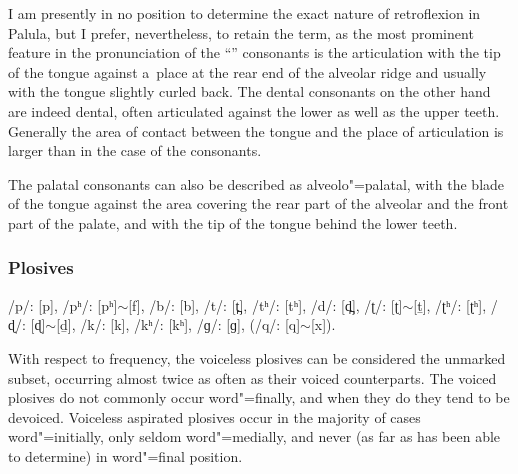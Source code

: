 


I am presently in no position to determine the exact nature of retroflexion in Palula, but I prefer, nevertheless, to retain the term, as the most prominent feature in the pronunciation of the ``'' consonants is the articulation with the tip of the tongue against a~place at the rear end of the alveolar ridge and usually with the tongue slightly curled back. The dental consonants on the other hand are indeed dental, often articulated against the lower as well as the upper teeth. Generally the area of contact between the tongue and the place of articulation is larger than in the case of the  consonants.


The palatal consonants can also be described as alveolo"=palatal, with the blade of the tongue against the area covering the rear part of the alveolar and the front part of the palate, and with the tip of the tongue behind the lower teeth. 

\subsubsection*{Plosives}
/p/: [p], /pʰ/: [pʰ]$\sim$[f], /b/: [b], /t/: [t̪], /tʰ/: [tʰ], /d/: [d̪], /ʈ/: [ʈ]$\sim$[ṯ], /ʈʰ/: [ʈʰ], /ɖ/: [ɖ]$\sim$[ḏ], /k/: [k], /kʰ/: [kʰ], /ɡ/: [ɡ], (/q/: [q]$\sim$[x]).

With respect to frequency, the voiceless plosives can be considered the unmarked subset, occurring almost twice as often as their voiced counterparts. The voiced plosives do not commonly occur word"=finally, and when they do they tend to be devoiced. Voiceless aspirated plosives occur in the majority of cases word"=initially, only seldom word"=medially, and never (as far as has been able to determine) in word"=final position. 



